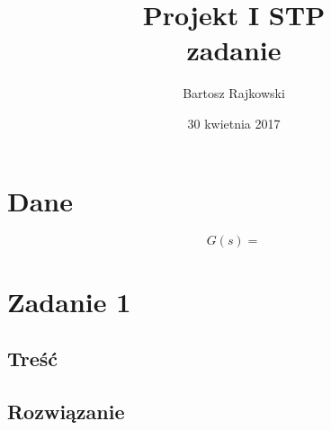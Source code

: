 \documentclass{article}
\author{Bartosz Rajkowski}
\title{Projekt I STP\\zadanie }
\date{30 kwietnia 2017}
\begin{document}
\maketitle
\newpage
\tableofcontents
\newpage
\section*{Dane}
$$
G(s)=
$$
\section{Zadanie 1}
\subsection{Treść}
\subsection{Rozwiązanie}
\end{document}
